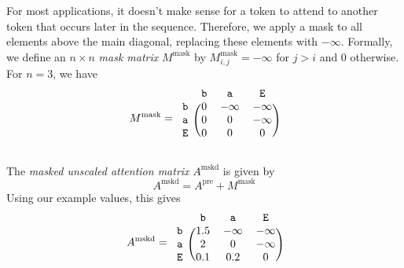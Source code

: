 \documentclass{article}
\newcommand{\ta}{\mathtt{a}}
\newcommand{\tb}{\mathtt{b}}
\newcommand{\tE}{\mathtt{E}}
\newcommand{\by}{\times}
\begin{document}
For most applications, it doesn't make sense for a token to attend to
another token that occurs later in the sequence. Therefore, we apply
a mask to all elements above the main diagonal, replacing these
elements with $-\infty$. Formally, we define an $n \by n$
\emph{mask matrix} $M^\text{mask}$ by $M^\text{mask}_{i,j}=-\infty$
for $j>i$ and 0 otherwise. For $n=3$, we have
\begin{displaymath}
  M^\text{mask} =
    \begin{blockarray}{cccc}
       & \tb & \ta & \tE   \\
      \begin{block}{c(ccc)}
        \tb & 0 & -\infty & -\infty  \\
        \ta & 0 & 0 & -\infty  \\
        \tE & 0 & 0 & 0  \\
      \end{block}
  \end{blockarray}
\end{displaymath}

The \emph{masked unscaled attention matrix} $A^\text{mskd}$ is given by
\begin{displaymath}
  A^\text{mskd} = A^\text{pre} + M^\text{mask}
\end{displaymath}
Using our example values, this gives
\begin{displaymath}
  A^\text{mskd} =
  \begin{blockarray}{cccc}
       & \tb & \ta & \tE   \\
      \begin{block}{c(ccc)}
        \tb & 1.5 & -\infty & -\infty  \\
        \ta & 2 & 0 & -\infty  \\
        \tE & 0.1 & 0.2 & 0  \\
      \end{block}
  \end{blockarray}
\end{displaymath}
\end{document}
